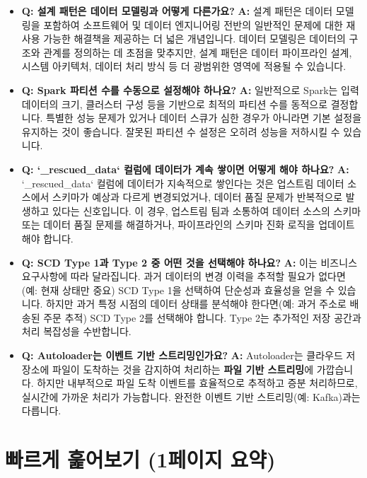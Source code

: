 \documentclass[11pt,a4paper]{article}
\begin{document}
\begin{itemize}
    \item \textbf{Q: 설계 패턴은 데이터 모델링과 어떻게 다른가요?}
    \textbf{A:} 설계 패턴은 데이터 모델링을 포함하여 소프트웨어 및 데이터 엔지니어링 전반의 일반적인 문제에 대한 재사용 가능한 해결책을 제공하는 더 넓은 개념입니다. 데이터 모델링은 데이터의 구조와 관계를 정의하는 데 초점을 맞추지만, 설계 패턴은 데이터 파이프라인 설계, 시스템 아키텍처, 데이터 처리 방식 등 더 광범위한 영역에 적용될 수 있습니다.

    \item \textbf{Q: Spark 파티션 수를 수동으로 설정해야 하나요?}
    \textbf{A:} 일반적으로 Spark는 입력 데이터의 크기, 클러스터 구성 등을 기반으로 최적의 파티션 수를 동적으로 결정합니다. 특별한 성능 문제가 있거나 데이터 스큐가 심한 경우가 아니라면 기본 설정을 유지하는 것이 좋습니다. 잘못된 파티션 수 설정은 오히려 성능을 저하시킬 수 있습니다.

    \item \textbf{Q: `_rescued_data` 컬럼에 데이터가 계속 쌓이면 어떻게 해야 하나요?}
    \textbf{A:} `_rescued_data` 컬럼에 데이터가 지속적으로 쌓인다는 것은 업스트림 데이터 소스에서 스키마가 예상과 다르게 변경되었거나, 데이터 품질 문제가 반복적으로 발생하고 있다는 신호입니다. 이 경우, 업스트림 팀과 소통하여 데이터 소스의 스키마 또는 데이터 품질 문제를 해결하거나, 파이프라인의 스키마 진화 로직을 업데이트해야 합니다.

    \item \textbf{Q: SCD Type 1과 Type 2 중 어떤 것을 선택해야 하나요?}
    \textbf{A:} 이는 비즈니스 요구사항에 따라 달라집니다. 과거 데이터의 변경 이력을 추적할 필요가 없다면(예: 현재 상태만 중요) SCD Type 1을 선택하여 단순성과 효율성을 얻을 수 있습니다. 하지만 과거 특정 시점의 데이터 상태를 분석해야 한다면(예: 과거 주소로 배송된 주문 추적) SCD Type 2를 선택해야 합니다. Type 2는 추가적인 저장 공간과 처리 복잡성을 수반합니다.

    \item \textbf{Q: Autoloader는 이벤트 기반 스트리밍인가요?}
    \textbf{A:} Autoloader는 클라우드 저장소에 파일이 도착하는 것을 감지하여 처리하는 \textbf{파일 기반 스트리밍}에 가깝습니다. 하지만 내부적으로 파일 도착 이벤트를 효율적으로 추적하고 증분 처리하므로, 실시간에 가까운 처리가 가능합니다. 완전한 이벤트 기반 스트리밍(예: Kafka)과는 다릅니다.
\end{itemize}

\newpage
\section{빠르게 훑어보기 (1페이지 요약)}
\end{document}
